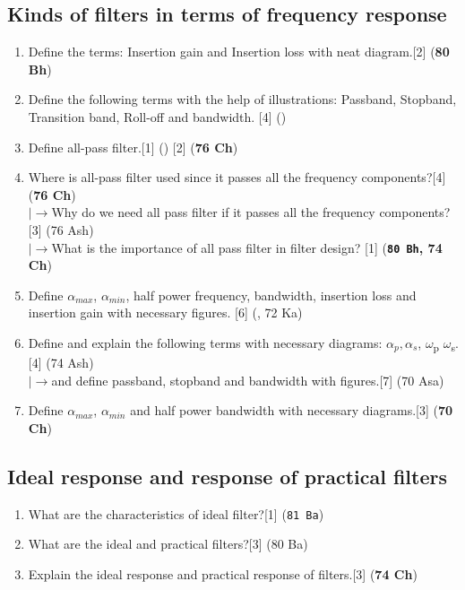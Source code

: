 \documentclass[12pt]{article}
\newcommand{\w}{\(\omega\)}
\newcommand{\lb}{\\$\left|\rightarrow\right.$}
\newcommand{\sub}[1]{\textsubscript{#1}}
\begin{document}
	\subsection{Kinds of filters in terms of frequency response}
		\begin{enumerate}
			\item Define the terms: Insertion gain and Insertion loss with neat diagram.\hfill[2] (\textbf{80 Bh})
			\item Define the following terms with the help of illustrations: Passband, Stopband, Transition band, Roll-off and bandwidth. \hspace{12.2cm} [4] ()
			\item Define all-pass filter.\hfill[1] () [2] (\textbf{76 Ch})
			\item Where is all-pass filter used since it passes all the frequency components?\hfill[4] (\textbf{76 Ch})
			\lb Why do we need all pass filter if it passes all the frequency components?\hfill[3] (76 Ash)
			\lb  What is the importance of all pass filter in filter design? \hfill [1] (\textbf{\texttt{80 Bh}, 74 Ch})
			\item Define $\alpha_{max}$, $\alpha_{min}$, half power frequency, bandwidth, insertion loss and insertion gain with necessary figures. \hspace{11.4cm} [6] (, 72 Ka)
			\item Define and explain the following terms with necessary diagrams: $\alpha_p, \alpha_s$, \w\sub{p} \w\sub{s}.\hfill[4] (74 Ash)
			\lb and define passband, stopband and bandwidth with figures.\hfill[7] (70 Asa)
			\item Define $\alpha_{max}$, $\alpha_{min}$ and half power bandwidth with necessary diagrams.\hfill[3] (\textbf{70 Ch})
		\end{enumerate}

	\subsection{Ideal response and response of practical filters}
		\begin{enumerate}
			\item What are the characteristics of ideal filter?\hfill[1] (\texttt{81 Ba})
			\item What are the ideal and practical filters?\hfill[3] (80 Ba)
			\item Explain the ideal response and practical response of filters.\hfill[3] (\textbf{74 Ch})
		\end{enumerate}
\end{document}
